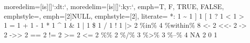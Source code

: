 {	moredelim=[is][\lst@r@symbolstyle]{`:dt:}{`}, %
	moredelim=[is][\lst@r@keystyle]{`:ky:}{`}, %
	emph={T, F, TRUE, FALSE},
	emphstyle={\lst@r@booleanstyle},
	emph={[2]NULL},
	emphstyle={[2]\lst@r@missingstyle},
	literate=
	*{:}       	{{\lst@r@operatorstyle {:}}}                            1
	{\~}        {{\lst@r@operatorstyle{\textasciitilde}}}               1
	{]}         {{\lst@r@delimiterstyle{]}}}                            1
	{[}         {{\lst@r@delimiterstyle{[}}}                            1
	{?}         {{}}                            1
	{<}         {{\lst@r@operatorstyle {<}}}                            1
	{>}         {{\lst@r@operatorstyle {>}}}                            1
	{=}         {{\lst@r@operatorstyle {=}}}                            1
	{+}         {{\lst@r@operatorstyle {+}}}                            1
	{-}         {{\lst@r@operatorstyle {-}}}                            1
	{*}         {{\lst@r@operatorstyle {*}}}                            1
	{\^}        {{\lst@r@operatorstyle {\textasciicircum}}}             1
	{\&}        {{\lst@r@operatorstyle {\&}}}                           1
	{|}         {{\lst@r@operatorstyle {|}}}                            1
	{\$}        {{\lst@r@operatorstyle {\$}}}                           1
	{/}         {{\lst@r@operatorstyle {/}}}                            1
	{!}         {{\lst@r@operatorstyle {!}}}                            1
	{|>}        {{\lst@r@operatorstyle {|>}}}                           2
	{\%in\%}    {{}}          4
	{\%within\%}{{}}      8
	{<-}        {{\lst@r@operatorstyle {<-}}}                           2
	{<<-}        {{\lst@r@operatorstyle {<<-}}}                         2
	{->}        {{\lst@r@operatorstyle {->}}}                           2
	{->>}        {{\lst@r@operatorstyle {->>}}}                         2
	{==}        {{\lst@r@operatorstyle {==}}}                           2
	{!=}        {{\lst@r@operatorstyle {!=}}}                           2
	{>=}        {{\lst@r@operatorstyle {>=}}}                           2
	{<=}        {{\lst@r@operatorstyle {<=}}}                           2
	{\%\%}      {{\lst@r@operatorstyle{\%\negthinspace\%}}}             2
	{\%/\%}     {{\lst@r@operatorstyle{\%/\negthinspace\%}}}            3
	{\%>\%}     {{\lst@r@operatorstyle{\texttt{\%>\negthinspace\%}}}}   3
	{\%--\%}     {{\lst@r@operatorstyle{\texttt{\%--\negthinspace\%}}}} 4
	{NA}        {{}}                            2
	{0}         {{}}                              1
}
